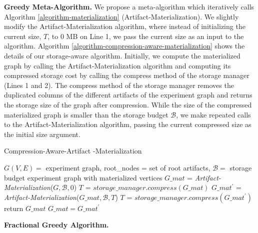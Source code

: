 \textbf{Greedy Meta-Algorithm.}
We propose a meta-algorithm which iteratively calls Algorithm \ref{algorithm-materialization} (Artifact-Materialization).
We slightly modify the Artifact-Materialization algorithm, where instead of initializing the current size, $T$, to 0 MB on Line 1, we pass the current size as an input to the algorithm. 
Algorithm \ref{algorithm-compression-aware-materialization} shows the details of our storage-aware algorithm.
Initially, we compute the materialized graph by calling the Artifact-Materialization algorithm and computing its compressed storage cost by calling the compress method of the storage manager (Lines 1 and 2).
The compress method of the storage manager removes the duplicated columns of the different artifacts of the experiment graph and returns the storage size of the graph after compression.
While the size of the compressed materialized graph is smaller than the storage budget $\mathcal{B}$, we make repeated calls to the Artifact-Materialization algorithm, passing the current compressed size as the initial size argument.
\begin{algorithm}[h]
\caption{Compression-Aware-Artifact -Materialization}\label{algorithm-compression-aware-materialization}
\begin{algorithmic}[1]
\Require  $G(V,E)=$ experiment graph, root\_nodes = set of root artifacts, $\mathcal{B}=$ storage budget
\Ensure experiment graph with materialized vertices
\State $G\_mat$ = \textit{Artifact-Materialization}($G, \mathcal{B}, 0$)
\State $T$ = $storage\_manager.compress(G\_mat)$
	\State $G\_mat^\prime$  = \textit{Artifact-Materialization}($G\_mat, \mathcal{B}, T$)
	\State $T$ = $storage\_manager.compress(G\_mat^\prime)$
		\State return $G\_mat$
	\Else
		 \State $G\_mat = G\_mat^\prime$
	\EndIf
\EndWhile
\end{algorithmic}
\end{algorithm}

\textbf{Fractional Greedy Algorithm.}
